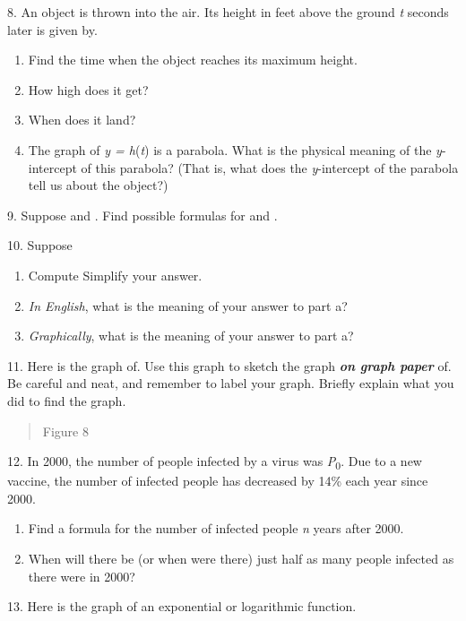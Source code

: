 8. An object is thrown into the air. Its height in feet above the ground
\emph{t} seconds later is given by.

\begin{enumerate}
\def\labelenumi{\alph{enumi}.}
\item
  Find the time when the object reaches its maximum height.
\item
  How high does it get?
\item
  When does it land?
\item
  The graph of \emph{y = h}(\emph{t}) is a parabola. What is the
  physical meaning of the \emph{y}-intercept of this parabola? (That is,
  what does the \emph{y}-intercept of the parabola tell us about the
  object?)
\end{enumerate}

9. Suppose and . Find possible formulas for and .

10. Suppose

\begin{enumerate}
\def\labelenumi{\alph{enumi}.}
\item
  Compute Simplify your answer.
\item
  \emph{In English}, what is the meaning of your answer to part a?
\item
  \emph{Graphically}, what is the meaning of your answer to part a?
\end{enumerate}

11. Here is the graph of. Use this graph to sketch the graph
\emph{\textbf{on graph paper}} of. Be careful and neat, and remember to
label your graph. Briefly explain what you did to find the graph.

\begin{quote}
Figure 8
\end{quote}

12. In 2000, the number of people infected by a virus was
\emph{P}\textsubscript{0}. Due to a new vaccine, the number of infected
people has decreased by 14\% each year since 2000.

\begin{enumerate}
\def\labelenumi{\alph{enumi}.}
\item
  Find a formula for the number of infected people \emph{n} years after
  2000.
\item
  When will there be (or when were there) just half as many people
  infected as there were in 2000?
\end{enumerate}

13. Here is the graph of an exponential or logarithmic function.

